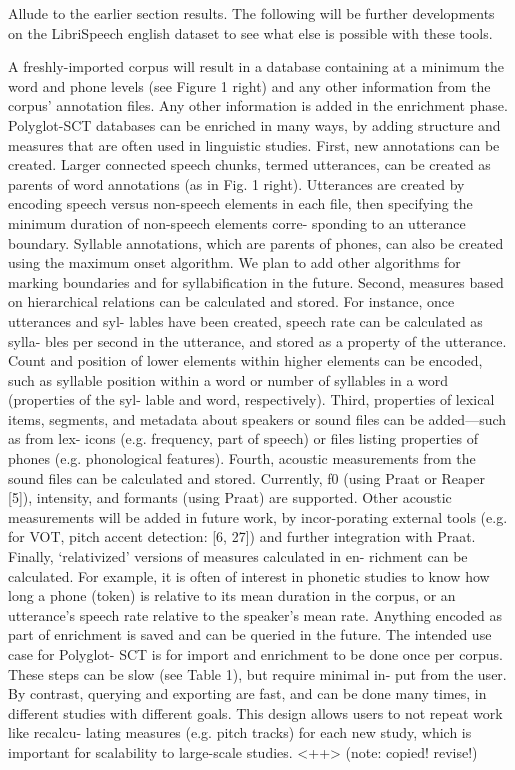 \documentclass[11pt]{article}
\begin{document}
Allude to the earlier section results. The following will be further developments on the LibriSpeech english dataset to see what else is possible with these tools.

A freshly-imported corpus will result in a database containing at
a minimum the word and phone levels (see Figure 1 right) and
any other information from the corpus’ annotation files. Any
other information is added in the enrichment phase.
Polyglot-SCT databases can be enriched in many ways, by
adding structure and measures that are often used in linguistic
studies. First, new annotations can be created. Larger connected
speech chunks, termed utterances, can be created as parents of
word annotations (as in Fig. 1 right). Utterances are created by
encoding speech versus non-speech elements in each file, then
specifying the minimum duration of non-speech elements corre-
sponding to an utterance boundary. Syllable annotations, which
are parents of phones, can also be created using the maximum
onset algorithm. We plan to add other algorithms for marking
boundaries and for syllabification in the future.
Second, measures based on hierarchical relations can be
calculated and stored. For instance, once utterances and syl-
lables have been created, speech rate can be calculated as sylla-
bles per second in the utterance, and stored as a property of the
utterance. Count and position of lower elements within higher
elements can be encoded, such as syllable position within a
word or number of syllables in a word (properties of the syl-
lable and word, respectively).
Third, properties of lexical items, segments, and metadata
about speakers or sound files can be added—such as from lex-
icons (e.g. frequency, part of speech) or files listing properties
of phones (e.g. phonological features).
Fourth, acoustic measurements from the sound files can
be calculated and stored. Currently, f0 (using Praat or Reaper
[5]), intensity, and formants (using Praat) are supported. Other
acoustic measurements will be added in future work, by incor-porating external tools (e.g. for VOT, pitch accent detection:
[6, 27]) and further integration with Praat.
Finally, ‘relativized’ versions of measures calculated in en-
richment can be calculated. For example, it is often of interest
in phonetic studies to know how long a phone (token) is relative
to its mean duration in the corpus, or an utterance’s speech rate
relative to the speaker’s mean rate.
Anything encoded as part of enrichment is saved and can
be queried in the future. The intended use case for Polyglot-
SCT is for import and enrichment to be done once per corpus.
These steps can be slow (see Table 1), but require minimal in-
put from the user. By contrast, querying and exporting are fast,
and can be done many times, in different studies with different
goals. This design allows users to not repeat work like recalcu-
lating measures (e.g. pitch tracks) for each new study, which is
important for scalability to large-scale studies.
<++> (note: copied! revise!)
\end{document}
